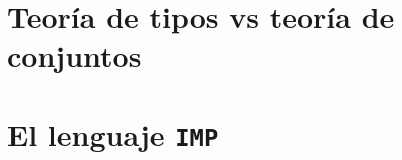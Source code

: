 \documentclass[a4paper, 10pt, openany]{report}
\begin{document}
\chapter{Teoría de tipos vs teoría de conjuntos}\label{CHAP:SETS}


\chapter{El lenguaje \texttt{IMP}}\label{CHAP:IMP}





% 

% 

% 






\end{document}
